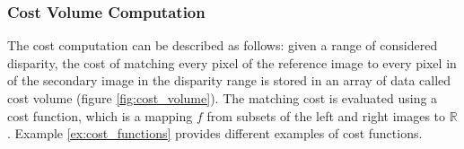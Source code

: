 \subsubsection{Cost Volume Computation}\label{sec:cost_volume_computation}
The cost computation can be described as follows: given a range of considered disparity, the cost of matching every pixel of the reference image to every pixel in of the secondary image in the disparity range is stored in an array of data called cost volume (figure \ref{fig:cost_volume}). The matching cost is evaluated using a cost function, which is a mapping $f$ from subsets of the left and right images to $\mathbb{R}$. Example \ref{ex:cost_functions} provides different examples of cost functions.

